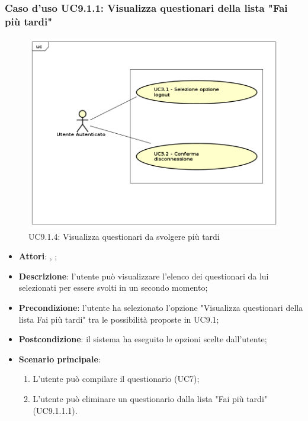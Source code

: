 			\subsubsection{Caso d'uso UC9.1.1: Visualizza questionari della lista "Fai più tardi"}
			\label{UC9.1.4}
			\begin{figure}[h]
				\centering
				\includegraphics[scale=0.5,keepaspectratio]{UML/UC9.png}
				\caption{UC9.1.4: Visualizza questionari da svolgere più tardi}
			\end{figure}
			\FloatBarrier
			\begin{itemize}
				\item \textbf{Attori}: \uau, \uaupro;
				\item \textbf{Descrizione}: l'utente può visualizzare l'elenco dei questionari da lui selezionati per essere svolti in un secondo momento;
				\item \textbf{Precondizione}: l'utente ha selezionato l'opzione "Visualizza questionari della lista Fai più tardi" tra le possibilità proposte in UC9.1;
				\item \textbf{Postcondizione}: il sistema ha eseguito le opzioni scelte dall'utente;
				\item \textbf{Scenario principale}: 
				\begin{enumerate}
					\item L'utente può compilare il questionario (UC7);
					\item L'utente può eliminare un questionario dalla lista "Fai più tardi" (UC9.1.1.1).
				\end{enumerate}
			\end{itemize}
				
